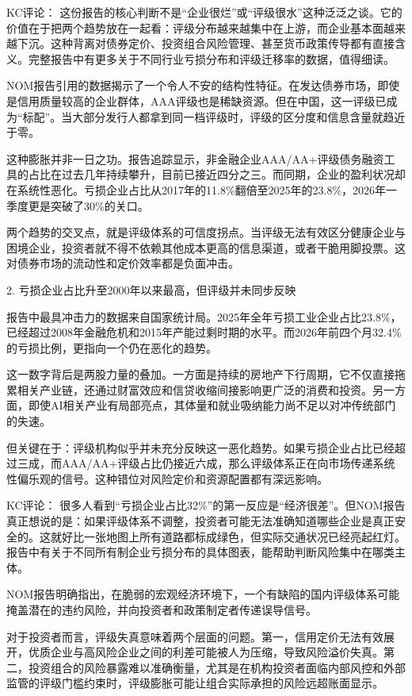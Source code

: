 \documentclass[11pt]{ctexart}
\begin{document}
KC评论： 这份报告的核心判断不是“企业很烂”或“评级很水”这种泛泛之谈。它的价值在于把两个趋势放在一起看：评级分布越来越集中在上游，而企业基本面越来越下沉。这种背离对债券定价、投资组合风险管理、甚至货币政策传导都有直接含义。完整报告中有更多关于不同行业亏损分布和评级迁移率的数据，值得细读。

NOM报告引用的数据揭示了一个令人不安的结构性特征。在发达债券市场，即使是信用质量较高的企业群体，AAA评级也是稀缺资源。但在中国，这一评级已成为“标配”。当大部分发行人都拿到同一档评级时，评级的区分度和信息含量就趋近于零。

这种膨胀并非一日之功。报告追踪显示，非金融企业AAA/AA+评级债务融资工具的占比在过去几年持续攀升，目前已接近四分之三。而同期，企业的盈利状况却在系统性恶化。亏损企业占比从2017年的11.8\%翻倍至2025年的23.8\%，2026年一季度更是突破了30\%的关口。

两个趋势的交叉点，就是评级体系的可信度拐点。当评级无法有效区分健康企业与困境企业，投资者就不得不依赖其他成本更高的信息渠道，或者干脆用脚投票。这对债券市场的流动性和定价效率都是负面冲击。

2. 亏损企业占比升至2000年以来最高，但评级并未同步反映

报告中最具冲击力的数据来自国家统计局。2025年全年亏损工业企业占比23.8\%，已经超过2008年金融危机和2015年产能过剩时期的水平。而2026年前四个月32.4\%的亏损比例，更指向一个仍在恶化的趋势。

这一数字背后是两股力量的叠加。一方面是持续的房地产下行周期，它不仅直接拖累相关产业链，还通过财富效应和信贷收缩间接影响更广泛的消费和投资。另一方面，即使AI相关产业有局部亮点，其体量和就业吸纳能力尚不足以对冲传统部门的失速。

但关键在于：评级机构似乎并未充分反映这一恶化趋势。如果亏损企业占比已经超过三成，而AAA/AA+评级占比仍接近六成，那么评级体系正在向市场传递系统性偏乐观的信号。这种错位对风险定价和资源配置都有深远影响。

KC评论： 很多人看到“亏损企业占比32\%”的第一反应是“经济很差”。但NOM报告真正想说的是：如果评级体系不调整，投资者可能无法准确知道哪些企业是真正安全的。这就好比一张地图上所有道路都标成绿色，但实际交通状况已经亮起红灯。报告中有关于不同所有制企业亏损分布的具体图表，能帮助判断风险集中在哪类主体。

NOM报告明确指出，在脆弱的宏观经济环境下，一个有缺陷的国内评级体系可能掩盖潜在的违约风险，并向投资者和政策制定者传递误导信号。

对于投资者而言，评级失真意味着两个层面的问题。第一，信用定价无法有效展开，优质企业与高风险企业之间的利差可能被人为压缩，导致风险溢价失真。第二，投资组合的风险暴露难以准确衡量，尤其是在机构投资者面临内部风控和外部监管的评级门槛约束时，评级膨胀可能让组合实际承担的风险远超账面显示。
\end{document}
